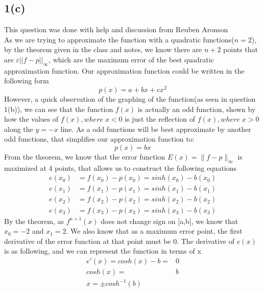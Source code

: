 \documentclass{article}
\begin{document}
\subsection*{1(c)}
This question was done with help and discussion from Reuben Aronson\\
As we are trying to approximate the function with a quadratic functions($n = 2$), by the theorem given in the class and notes, we know there are $n+2$ points that are $\varepsilon ||f-p||_\infty$, which are the maximum error of the best quadratic approximation function. Our approximation function could be written in the following form
\begin{equation*}
p(x) = a + bx + cx^2
\end{equation*}
However, a quick observation of the graphing of the function(as seen in question 1(b)), we can see that the function $f(x)$ is actually an odd function, shown by how the values of $f(x), where\;x<0$ is just the reflection of $f(x),where\;x>0$ along the $y = -x$ line. As a odd functions will be best approximate by another odd functions, that simplifies our approximation function to:
\begin{equation} \label{eq:2}
p(x) = bx
\end{equation}
From the theorem, we know that the error function $E(x) = \|f-p\|_{\infty}$ is maximized at 4 points, that allows us to construct the following equations
\begin{equation*}
\begin{aligned}
e(x_0) &= f(x_0) - p(x_0) = sinh(x_0) - b(x_0)\\
e(x_1) &= f(x_1) - p(x_1) = sinh(x_1) - b(x_1)\\
e(x_2) &= f(x_2) - p(x_2) = sinh(x_2) - b(x_2)\\
e(x_3) &= f(x_3) - p(x_3) = sinh(x_3) - b(x_3)
\end{aligned}
\end{equation*}
By the theorem, as $f^{n+1}(x)$ does not change sign on [a,b], we know that $x_0 = -2$ and $x_1 = 2$. We also know that as a maximum error point, the first derivative of the error function at that point must be $0$. The derivative of $e(x)$ is as following, and we can represent the function in terms of x
\begin{equation} \label{eq:1}
\begin{aligned}
e'(x) = cosh(x) - b =& 0\\
cosh(x) = & b\\
x = \pm cosh^{-1}(b)
\end{aligned}
\end{equation}  
\end{document}
